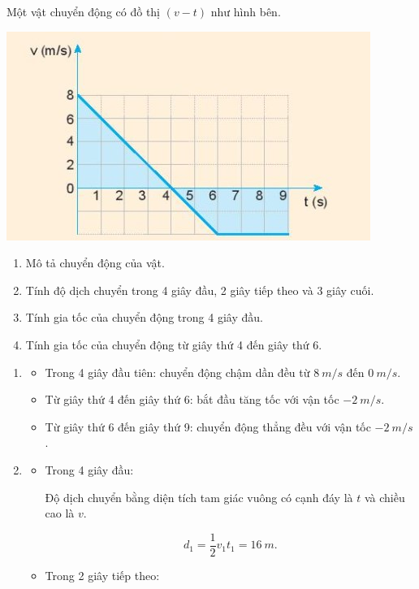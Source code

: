 \begin{enumerate}[label=\bfseries Bài \arabic*:,leftmargin=1.5cm]
	
	{Một vật chuyển động có đồ thị $(v-t)$ như hình bên.
		\begin{center}
			\includegraphics[scale=1]{../figs/VN10-2022-PH-TP012-4.jpg}
		\end{center}
		\begin{enumerate}[label=\alph*)]
			\item Mô tả chuyển động của vật.
			\item Tính độ dịch chuyển trong 4 giây đầu, 2 giây tiếp theo và 3 giây cuối.
			\item Tính gia tốc của chuyển động trong 4 giây đầu.
			\item Tính gia tốc của chuyển động từ giây thứ 4 đến giây thứ 6.
		\end{enumerate}
		
	}
	
	\hideall
	{	\begin{enumerate}[label=\alph*)]
			\item 
			\begin{itemize}
				\item Trong 4 giây đầu tiên: chuyển động chậm dần đều từ  $\SI{8}{m/s}$ đến  $\SI{0}{m/s}$.
				\item Từ giây thứ 4 đến giây thứ 6: bắt đầu tăng tốc với vận tốc  $- \SI{2}{m/s}$.
				\item Từ giây thứ 6 đến giây thứ 9: chuyển động thẳng đều với vận tốc $- \SI{2}{m/s}$.
			\end{itemize}
	\item 
	\begin{itemize}
		\item Trong 4 giây đầu:
		
		Độ dịch chuyển bằng diện tích tam giác vuông có cạnh đáy là $t$ và chiều cao là $v$.
		
		$$d_1 = \dfrac{1}{2}v_1t_1 = \SI{16}{m}.$$
		\item Trong 2 giây tiếp theo:
		

\end{itemize}
\end{enumerate}}
\end{enumerate}
